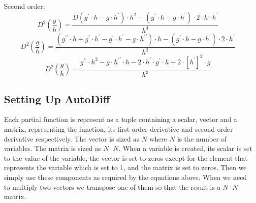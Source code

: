 \documentclass[11pt, oneside]{article}
\begin{document}
Second order:
\begin{equation}
D^2(\frac{g}{h}) = \frac{D(g^\prime \cdot h - g \cdot h^\prime) \cdot h^2 - (g^\prime \cdot h - g \cdot h^\prime) \cdot 2 \cdot h \cdot h^\prime}{h^4} 
\end{equation}
\begin{equation}
D^2(\frac{g}{h}) = \frac{(g^{\prime\prime} \cdot h + g^\prime \cdot h^\prime - g^\prime \cdot h^\prime - g \cdot h^{\prime\prime}) \cdot h - (g^\prime \cdot h - g \cdot h^\prime) \cdot 2 \cdot h^\prime}{h^3} 
\end{equation}
\begin{equation}
D^2(\frac{g}{h}) = \frac{g^{\prime\prime} \cdot h^2 - g \cdot h^{\prime\prime} \cdot h - 2 \cdot h^\prime \cdot g^\prime \cdot h + 2 \cdot [h^\prime]^2 \cdot g }{h^3} 
\end{equation}

\subsection{Setting Up AutoDiff}

Each partial function is represent as a tuple containing a scalar, vector and a matrix, representing the function, its first order derivative and second order derivative respectively. The vector is sized as $N$ where $N$ is the number of variables. The matrix is sized as $N \cdot N$. When a variable is created, its scalar is set to the value of the variable, the vector is set to zeros except for the element that represents the variable which is set to 1, and the matrix is set to zeros. Then we simply use these components as required by the equations above. When we need to multiply two vectors we transpose one of them so that the result is a $N \cdot N$ matrix.
\end{document}
